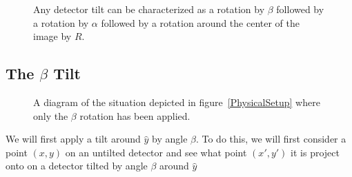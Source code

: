 \begin{figure}
\centering
{}
\caption{Any detector tilt can be characterized 
as a rotation by $\beta$ followed by a rotation by $\alpha$
followed by a rotation around the center of the image by
$R$.}
\label{ThreeTilts}
\end{figure}


\subsection{The $\beta$ Tilt}

\begin{figure}
\centering
\subfloat[]{\label{PitchX_A}} 
\hfill
\subfloat[]{
\label{PitchX_B}}
\caption{A diagram of the situation depicted in 
figure~\ref{PhysicalSetup} where only the 
$\beta$ rotation has been applied.}
\label{PitchX}
\end{figure}

We will first apply a tilt around $\hat{y}$ by angle $\beta$.
To do this, we will first consider a point $(x,y)$ on an
untilted detector and see what point $(x',y')$ it is 
project onto on a detector tilted by angle $\beta$ around
$\hat{y}$

